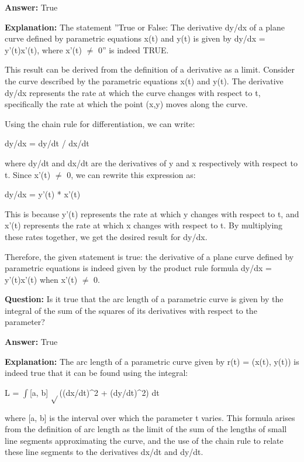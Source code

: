 \documentclass{article}
\begin{document}
                \textbf{Answer:} True

                \textbf{Explanation:} The statement ''True or False: The derivative dy/dx of a plane curve defined by parametric equations x(t) and y(t) is given by dy/dx = y'(t)x'(t), where x'(t) \ensuremath{\neq} 0'' is indeed TRUE.

This result can be derived from the definition of a derivative as a limit. Consider the curve described by the parametric equations x(t) and y(t). The derivative dy/dx represents the rate at which the curve changes with respect to t, specifically the rate at which the point (x,y) moves along the curve.

Using the chain rule for differentiation, we can write:

dy/dx = dy/dt / dx/dt

where dy/dt and dx/dt are the derivatives of y and x respectively with respect to t. Since x'(t) \ensuremath{\neq} 0, we can rewrite this expression as:

dy/dx = y'(t) * x'(t)

This is because y'(t) represents the rate at which y changes with respect to t, and x'(t) represents the rate at which x changes with respect to t. By multiplying these rates together, we get the desired result for dy/dx.

Therefore, the given statement is true: the derivative of a plane curve defined by parametric equations is indeed given by the product rule formula dy/dx = y'(t)x'(t) when x'(t) \ensuremath{\neq} 0.
                
                \vspace{0.5cm} 
        
            
            
                \textbf {Question:} Is it true that the arc length of a parametric curve is given by the integral of the sum of the squares of its derivatives with respect to the parameter?
                
                \textbf{Answer:} True

                \textbf{Explanation:} The arc length of a parametric curve given by r(t) = (x(t), y(t)) is indeed true that it can be found using the integral:

L = \ensuremath{\int}[a, b] \ensuremath{\sqrt{}}((dx/dt){\textasciicircum}2 + (dy/dt){\textasciicircum}2) dt

where [a, b] is the interval over which the parameter t varies. This formula arises from the definition of arc length as the limit of the sum of the lengths of small line segments approximating the curve, and the use of the chain rule to relate these line segments to the derivatives dx/dt and dy/dt.
                
\end{document}

